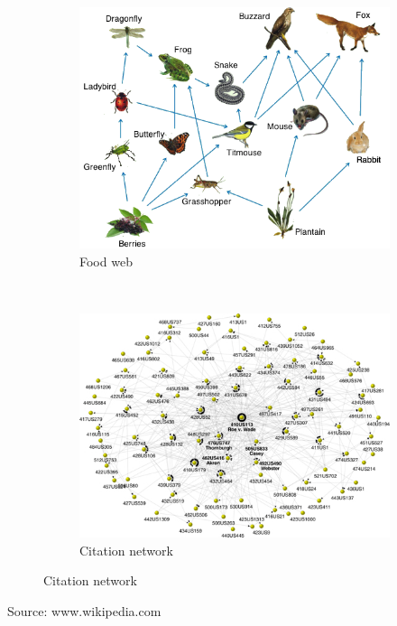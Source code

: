 \documentclass{beamer}
\begin{document}
\begin{frame}
\begin{figure}[!h]
\begin{subfigure}[b]{0.3\textwidth}
		\end{subfigure}\\
		\begin{subfigure}[b]{0.3\textwidth}
			\includegraphics[width=\textwidth]{images/food-web-2.png}
			\caption{Food web}
		\end{subfigure}~
		\begin{subfigure}[b]{0.3\textwidth}
			\includegraphics[width= \textwidth]{images/citation.jpg}
			\caption{Citation network}
		\end{subfigure}
	\end{figure}
Source: www.wikipedia.com
\end{frame}
\end{document}

